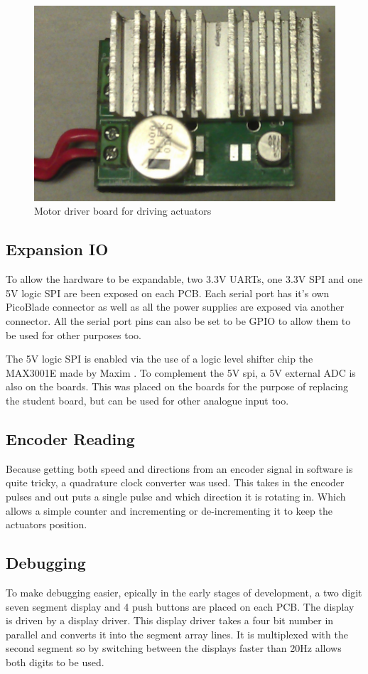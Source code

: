    \begin{figure}[h]
     \centering
     \includegraphics[width=.9\linewidth]{Images/motorPCB.png}
     \caption{Motor driver board for driving actuators}
     \label{motorPCB}
   \end{figure}


  \subsection{Expansion IO}
  To allow the hardware to be expandable, two 3.3V UARTs, one 3.3V SPI and
  one 5V logic SPI are been exposed on each PCB. Each serial port has it's own
  PicoBlade connector\cite{PicoBlade} as well as all the power supplies are
  exposed via another connector. All the serial port pins can also be set to be
  GPIO to allow them to be used for other purposes too.

  The 5V logic SPI is enabled via the use of a logic level shifter chip
  the MAX3001E made by Maxim \cite{MAX3001E}. To complement the 5V spi, a 5V
  external ADC is also on the boards. This was placed on the boards for the
  purpose of replacing the student board, but can be used for other analogue
  input too.

  \subsection{Encoder Reading}
  Because getting both speed and directions from an encoder signal in software
  is quite tricky, a quadrature clock converter was used. This takes in the
  encoder pulses and out puts a single pulse and which direction it is rotating
  in. Which allows a simple counter and incrementing or de-incrementing it to
  keep the actuators position.

  \subsection{Debugging}
  To make debugging easier, epically in the early stages of development, a two
  digit seven segment display and 4 push buttons are placed on each PCB. The
  display is driven by a display driver. This display driver takes a four bit
  number in parallel and converts it into the segment array lines. It is
  multiplexed with the second segment so by switching between the displays
  faster than 20Hz allows both digits to be used.

